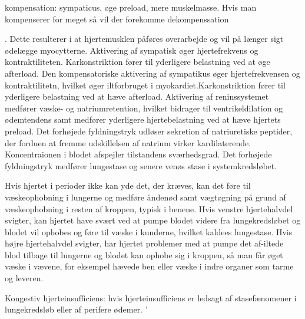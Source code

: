 kompensation: sympaticus, øge preload, mere muskelmasse. 
Hvis man kompenserer for meget så vil der forekomme dekompenssation


. Dette resulterer i at hjertemusklen påføres overarbejde og vil på længer sigt ødelægge myocytterne. Aktivering af sympatisk øger hjertefrekvens og  kontraktiliteten. Karkonstriktion fører til yderligere belastning ved at øge afterload.
Den kompensatoriske aktivering af sympatikus øger hjertefrekvensen og kontraktilitetn, hvilket øger iltforbruget i myokardiet.Karkonstriktion fører til yderligere belastning ved at hæve afterload. Aktivering af reninssystemet medfører væske- og natriumretention, hvilket bidrager til ventrikeldilation og ødemtendens samt medfører yderligere hjertebelastning ved at hæve hjertets preload. Det forhøjede fyldningstryk udløser sekretion af natriuretiske peptider,  der forduen at fremme udskillelsen af natrium virker kardilaterende. Koncentraionen i blodet afspejler tilstandens sværhedsgrad.  Det forhøjede fyldningstryk medfører lungestase og senere venøs stase i systemkredsløbet. 

Hvis hjertet i perioder ikke kan yde det, der kræves, kan det føre til væskeophobning i lungerne og medføre åndenød samt vægtøgning på grund af væskeophobning i resten af kroppen, typisk i benene. 
Hvis venstre hjertehalvdel svigter, kan hjertet have svært ved at pumpe blodet videre fra lungekredsløbet og blodet vil ophobes og føre til væske i kunderne, hvilket kaldees lungestase.
Hvis højre hjertehalvdel svigter, har hjertet problemer med at pumpe det af-iltede blod tilbage til lungerne og blodet kan ophobe sig i kroppen, så man får øget væske i vævene, for eksempel hævede ben eller væske i indre organer som tarme og leveren. 


Kongestiv hjerteinsufficiens: hvis hjerteinsufficiens er ledsagt af stasefænomener i lungekredsløb eller af perifere ødemer. ’




\cite{Martini2015}